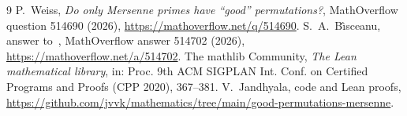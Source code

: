 \documentclass[11pt]{amsart}
\theoremstyle{remark}
\begin{document}
\begin{thebibliography}{9}
 P.~Weiss, \emph{Do only Mersenne primes have ``good'' permutations?}, MathOverflow question 514690 (2026), \url{https://mathoverflow.net/q/514690}.
 S.~A.~B\^{\i}sceanu, answer to~\cite{MO}, MathOverflow answer 514702 (2026), \url{https://mathoverflow.net/a/514702}.
 The mathlib Community, \emph{The Lean mathematical library}, in: Proc. 9th ACM SIGPLAN Int. Conf. on Certified Programs and Proofs (CPP 2020), 367--381.
 V.~Jandhyala, code and Lean proofs, \url{https://github.com/jvvk/mathematics/tree/main/good-permutations-mersenne}.
\end{thebibliography}
\end{document}
